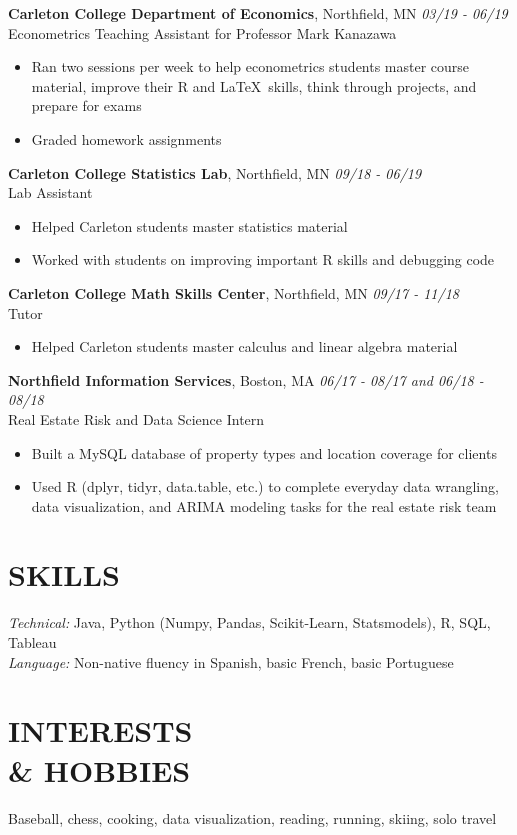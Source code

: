 \documentclass[margin, 10pt]{res} %
\begin{document}
\begin{resume}
{\sl} \textbf{Carleton College Department of Economics}, Northfield, MN \hfill \textit{03/19 - 06/19}\\
{\sl} Econometrics Teaching Assistant for Professor Mark Kanazawa\smallskip
{\sl} \begin{itemize}
	\item Ran two sessions per week to help econometrics students master course material, improve their R and \LaTeX \ skills, think through projects, and prepare for exams
	\item Graded homework assignments
\end{itemize}


{\sl} \textbf{Carleton College Statistics Lab}, Northfield, MN \hfill \textit{09/18 - 06/19}\\
{\sl} Lab Assistant \smallskip
{\sl} \begin{itemize}
\item Helped Carleton students master statistics material
\item Worked with students on improving important R skills and debugging code
\end{itemize}

{\sl} \textbf{Carleton College Math Skills Center}, Northfield, MN \hfill \textit{09/17 - 11/18}\\
{\sl} Tutor \smallskip
{\sl} \begin{itemize}
\item Helped Carleton students master calculus and linear algebra material
\end{itemize}

{\sl} \textbf{Northfield Information Services}, Boston, MA \hfill \textit{06/17 - 08/17 and 06/18 - 08/18}\\
{\sl} Real Estate Risk and Data Science Intern \smallskip
{\sl} \begin{itemize}
\item Built a MySQL database of property types and location coverage for clients
\item Used R (dplyr, tidyr, data.table, etc.) to complete everyday data wrangling, data visualization, and ARIMA modeling tasks for the real estate risk team
\end{itemize}


\section{SKILLS}
{\sl Technical:} Java, Python (Numpy, Pandas, Scikit-Learn, Statsmodels), R, SQL, Tableau\\ \smallskip
{\sl Language:} Non-native fluency in Spanish, basic French, basic Portuguese

\section{INTERESTS \\\& HOBBIES}
{\sl} Baseball, chess, cooking, data visualization, reading, running, skiing, solo travel

\end{resume}
\end{document}
